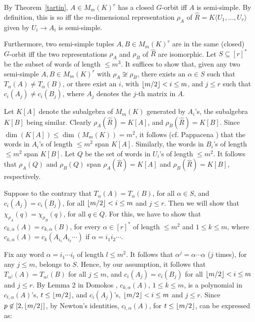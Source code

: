 \documentclass[11pt]{article}
\begin{document}
By Theorem~\ref{tartin}, $A \in M_m(K)^r$ has a closed $G$-orbit iff $A$ is semi-simple. By definition, this 
is so iff the $m$-dimensional representation
$\rho_A$ of $\hat R=K\langle U_1,\ldots,U_r\rangle$ given by $U_i \rightarrow A_i$ is semi-simple.

Furthermore, two semi-simple tuples $A, B \in M_m(K)^r$ are in the same (closed) $G$-orbit iff
the two representations $\rho_A$ and $\rho_B$ of $\hat R$ are isomorphic.
Let $S \subseteq [r]^*$ be the  subset of words  of length $\le m^3$. 
It suffices to show that, given any two semi-simple
$A, B \in M_m(K)^r$ with $\rho_A \not \cong \rho_B$, there exists an $\alpha \in S$ such that $T_\alpha(A) \not = T_\alpha(B)$, or there 
exist an $i$, with ${\lfloor m/2 \rfloor} < i \le m$,  and $j \le r$
such that $c_i(A_j) \not = c_i(B_j)$, where $A_j$ denotes the $j$-th matrix in $A$.

Let $K[A]$ denote the subalgebra of $M_m(K)$ generated by $A_i$'s, the subalgebra $K[B]$ being similar.
Clearly $\rho_A(\hat R)=K[A]$, and $\rho_B(\hat R)=K[B]$.
Since $\dim(K[A]) \le \dim(M_m(K))=m^2$, it follows (cf. Pappacena \cite{pappacena}) that the
words in $A_i$'s of length $\le m^2$ span $K[A]$.
Similarly, the words in $B_i$'s of length $\le m^2$ span $K[B]$.  Let $Q$ be the set of words in $U_i$'s of length $\le m^2$. 
It follows that $\rho_A(Q)$ and $\rho_B(Q)$ span $\rho_A(\hat R)=K[A]$ and $\rho_B(\hat R)=K[B]$, respectively.

Suppose to the contrary that $T_\alpha(A)=T_\alpha(B)$, for all $\alpha \in S$,
and $c_i(A_j)=c_i(B_j)$, for all ${\lfloor m/2 \rfloor} < i \le m$ and $j \le r$. 
Then we will show that $\chi_{\rho_A}(q)=\chi_{\rho_B}(q)$, for all $q \in Q$.
For this, we have to show that
$c_{k,\alpha}(A)=c_{k,\alpha}(B)$, for every $\alpha \in [r]^*$ of length $\le m^2$
and  $1 \le k \le m$, where $c_{k,\alpha}(A)=c_k(A_{i_1} A_{i_2} \cdots)$ if $\alpha=i_1 i_2 \cdots$.

Fix any word $\alpha=i_1 \cdots i_l$ of length $l \le m^2$.
It follows that $\alpha^j=\alpha \cdots \alpha$ ($j$ times), for any $j \le m$, 
belongs to $S$. Hence, by our assumption, it follows that $T_{\alpha^j}(A)=T_{\alpha^j}(B)$ for 
all $j \le m$, and $c_i(A_j)= c_i(B_j)$ for all ${\lfloor m/2 \rfloor} < i \le m$ and $j \le r$.  
By Lemma 2 in Domokos \cite{domokos}, 
$c_{k,\alpha}(A)$,  $1 \le k \le m$, is a polynomial in 
$c_{t,\alpha}(A)$'s, $t \le {\lfloor m/2 \rfloor}$, and $c_i(A_j)$'s, 
${\lfloor m/2 \rfloor} < i \le m$ and $j \le r$.  
Since $p \not \in [2,{\lfloor m/2 \rfloor}]$, by Newton's identities, $c_{t,\alpha}(A)$,
for $t \le {\lfloor m/2 \rfloor}$, can be expressed as:
\end{document}
